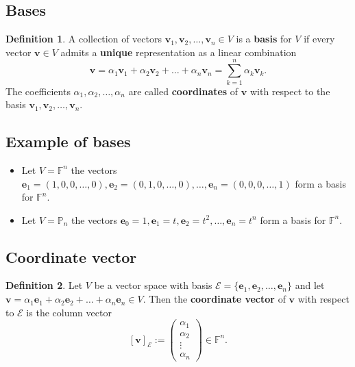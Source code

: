 \documentclass[12pt, a4paper]{article}
\theoremstyle{definition}
\newtheorem{definition}{Definition}[section]
\theoremstyle{plain}
\newcommand{\bb}[1]{\mathbb{#1}}
\newcommand{\vect}[1]{\mathbf{#1}}
\newcommand{\Cal}[1]{\mathcal{#1}}
\begin{document}
\subsection{Bases} 

\begin{definition} A collection of vectors $\vect{v}_1,\vect{v}_2,\ldots,\vect{v}_n \in V$ is a \textbf{basis} for $V$ if every vector $\vect{v}\in V$ admits a \textbf{unique} representation as a linear combination $$\vect{v} = \alpha_1\vect{v}_1+\alpha_2\vect{v}_2+\ldots+\alpha_n\vect{v}_n = \sum_{k=1}^{n} \alpha_k\vect{v}_k.$$ The coefficients $\alpha_1,\alpha_2,\ldots,\alpha_n$ are called \textbf{coordinates} of $\vect{v}$ with respect to the basis $\vect{v}_1,\vect{v}_2,\ldots,\vect{v}_n.$ \end{definition}

\subsection*{Example of bases}

\begin{itemize}

	\item Let $V=\bb{F}^n$ the vectors $\vect{e}_1=(1,0,0,\ldots,0),\vect{e}_2=(0,1,0,\ldots,0), \ldots, \vect{e}_n=(0,0,0,\ldots,1)$ form a basis for $\bb{F}^n.$

	\item Let $V=\bb{P}_n$ the vectors $\vect{e}_0=1,\vect{e}_1=t,\vect{e}_2=t^2,\ldots,\vect{e}_n=t^n$ form a basis for $\bb{F}^n.$

\end{itemize}

\subsection{Coordinate vector}

\begin{definition} Let $V$ be a vector space with basis $\Cal{E}=\{\vect{e}_1,\vect{e}_2,\ldots,\vect{e}_n\}$ and let $\vect{v}=\alpha_1\vect{e}_1+\alpha_2\vect{e}_2+\ldots+\alpha_n\vect{e}_n \in V.$ Then the \textbf{coordinate vector} of $\vect{v}$ with respect to $\Cal{E}$ is the column vector $$[\vect{v}]_{\Cal{E}}:=\begin{pmatrix} \alpha_1 \\ \alpha_2 \\ \vdots \\ \alpha_n\end{pmatrix} \in \bb{F}^n.$$ \end{definition}
\end{document}
